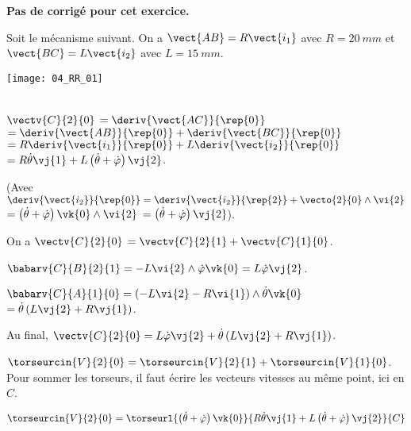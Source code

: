 \normaltrue
\correctiontrue


\setcounter{numques}{0}
\ifcorrection
\else
\textbf{Pas de corrigé pour cet exercice.}
\fi

\ifprof
\else
Soit le mécanisme suivant. On a $\vect{AB}=R\vect{i_1}$ avec $R=\SI{20}{mm}$ et  
$\vect{BC}=L\vect{i_2}$ avec $L=\SI{15}{mm}$.
\begin{center}
\texttt{[image: 04\_RR\_01]}
\end{center}
\fi

\ifprof ~\\
$\vectv{C}{2}{0}$ $ = \deriv{\vect{AC}}{\rep{0}}$
$ = \deriv{\vect{AB}}{\rep{0}}+\deriv{\vect{BC}}{\rep{0}}$
$ = R\deriv{\vect{i_1}}{\rep{0}}+L\deriv{\vect{i_2}}{\rep{0}}$
$ = R\dot{\theta}\vj{1}+L\left( \dot{\theta}+\dot{\varphi}\right)\vj{2}$.

(Avec $\deriv{\vect{i_2}}{\rep{0}} = \deriv{\vect{i_2}}{\rep{2}} + \vecto{2}{0}\wedge \vi{2}$
$ = \left( \dot{\theta}+\dot{\varphi}\right)\vk{0}\wedge \vi{2}$ $ = \left( \dot{\theta}+\dot{\varphi}\right)\vj{2}$).
\else
\fi


\ifprof
On a $\vectv{C}{2}{0} $ $= \vectv{C}{2}{1}+\vectv{C}{1}{0}$.

$\babarv{C}{B}{2}{1} = -L\vi{2}\wedge \dot{\varphi}\vk{0}= L\dot{\varphi}\vj{2}$.

$\babarv{C}{A}{1}{0} = \left( -L\vi{2} -R\vi{1}\right)\wedge  \dot{\theta}\vk{0}$
$=\dot{\theta}\left( L\vj{2} +R\vj{1}\right)$.

Au final, $\vectv{C}{2}{0} = L\dot{\varphi}\vj{2} + \dot{\theta}\left( L\vj{2} +R\vj{1}\right)$.

\else
\fi

\ifprof
$\torseurcin{V}{2}{0}=\torseurcin{V}{2}{1}+\torseurcin{V}{1}{0}$. Pour sommer les torseurs, il faut écrire les vecteurs vitesses au même point, ici en $C$. 

$\torseurcin{V}{2}{0}=\torseurl{ \left( \dot{\theta}+\dot{\varphi}\right)\vk{0}}{R\dot{\theta}\vj{1}+L\left( \dot{\theta}+\dot{\varphi}\right)\vj{2}}{C}$
 \else
\fi

\ifprof~\\

